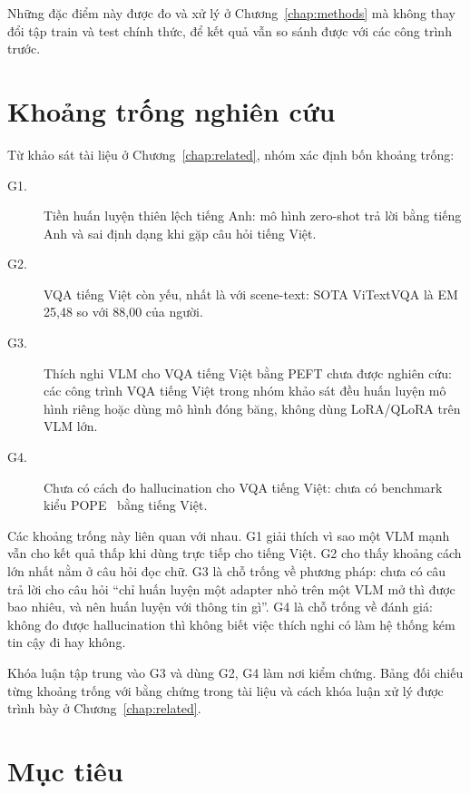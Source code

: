Những đặc điểm này được đo và xử lý ở Chương~\ref{chap:methods} mà không thay đổi
tập train và test chính thức, để kết quả vẫn so sánh được với các công trình
trước.

\section{Khoảng trống nghiên cứu}
\label{sec:intro-gaps}

Từ khảo sát tài liệu ở Chương~\ref{chap:related}, nhóm xác định bốn khoảng
trống:

\begin{description}
  \item[G1.] Tiền huấn luyện thiên lệch tiếng Anh: mô hình zero-shot trả lời bằng
  tiếng Anh và sai định dạng khi gặp câu hỏi tiếng Việt.
  \item[G2.] VQA tiếng Việt còn yếu, nhất là với scene-text: SOTA ViTextVQA là EM
  25,48 so với 88,00 của người.
  \item[G3.] Thích nghi VLM cho VQA tiếng Việt bằng PEFT chưa được nghiên cứu:
  các công trình VQA tiếng Việt trong nhóm khảo sát đều huấn luyện mô hình riêng
  hoặc dùng mô hình đóng băng, không dùng LoRA/QLoRA trên VLM lớn.
  \item[G4.] Chưa có cách đo hallucination cho VQA tiếng Việt: chưa có benchmark
  kiểu POPE~\cite{li2023pope} bằng tiếng Việt.
\end{description}

Các khoảng trống này liên quan với nhau. G1 giải thích vì sao một VLM mạnh vẫn
cho kết quả thấp khi dùng trực tiếp cho tiếng Việt. G2 cho thấy khoảng cách lớn
nhất nằm ở câu hỏi đọc chữ. G3 là chỗ trống về phương pháp: chưa có câu trả lời
cho câu hỏi ``chỉ huấn luyện một adapter nhỏ trên một VLM mở thì được bao nhiêu,
và nên huấn luyện với thông tin gì''. G4 là chỗ trống về đánh giá: không đo được
hallucination thì không biết việc thích nghi có làm hệ thống kém tin cậy đi hay
không.

Khóa luận tập trung vào G3 và dùng G2, G4 làm nơi kiểm chứng. Bảng đối chiếu từng
khoảng trống với bằng chứng trong tài liệu và cách khóa luận xử lý được trình bày
ở Chương~\ref{chap:related}.

\section{Mục tiêu}
\label{sec:intro-objectives}

